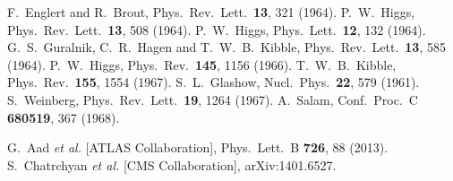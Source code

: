 \documentclass[aps,prl,twocolumn,preprintnumbers,groupedaddress,nofootinbib]{revtex4}
\begin{document}
\begin{thebibliography}{99}
  F.~Englert and R.~Brout,
  Phys.\ Rev.\ Lett.\  {\bf 13}, 321 (1964).
  P.~W.~Higgs,
  Phys.\ Rev.\ Lett.\  {\bf 13}, 508 (1964).
  P.~W.~Higgs,
  Phys.\ Lett.\  {\bf 12}, 132 (1964).
  G.~S.~Guralnik, C.~R.~Hagen and T.~W.~B.~Kibble,
  Phys.\ Rev.\ Lett.\  {\bf 13}, 585 (1964).
  P.~W.~Higgs,
  Phys.\ Rev.\  {\bf 145}, 1156 (1966).
  T.~W.~B.~Kibble,
  Phys.\ Rev.\  {\bf 155}, 1554 (1967).
  S.~L.~Glashow,
  Nucl.\ Phys.\  {\bf 22}, 579 (1961).
  S.~Weinberg,
  Phys.\ Rev.\ Lett.\  {\bf 19}, 1264 (1967).
  A.~Salam,
  Conf.\ Proc.\ C {\bf 680519}, 367 (1968).
  
  G.~Aad {\it et al.}  [ATLAS Collaboration],
  Phys.\ Lett.\ B {\bf 726}, 88 (2013).
  S.~Chatrchyan {\it et al.}  [CMS Collaboration],
  arXiv:1401.6527. %
  

\end{thebibliography}
\end{document}
